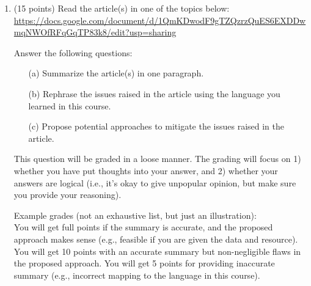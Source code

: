 \documentclass[11pt]{article}
\begin{document}
\begin{enumerate}

\item (15 points) Read the article(s) in one of the topics below:\\
\url{https://docs.google.com/document/d/1QmKDwodF9gTZQzrzQuES6EXDDwmqNWOfRFqGqTP83k8/edit?usp=sharing}

Answer the following questions:
\begin{itemize}
    \item[(a)] Summarize the article(s) in one paragraph.
    \item[(b)] Rephrase the issues raised in the article using the language you learned in this course.
    \item[(c)] Propose potential approaches to mitigate the issues raised in the article.
\end{itemize}

This question will be graded in a loose manner.
The grading will focus on 
1) whether you have put thoughts into your answer, and
2) whether your answers are logical (i.e., it's okay to give unpopular opinion, but make sure you provide your reasoning).

Example grades (not an exhaustive list, but just an illustration):\\
You will get full points if the summary is accurate, and the proposed approach makes sense (e.g., feasible if you are given the data and resource). 
You will get 10 points with an accurate summary but non-negligible flaws in the proposed approach.  
You will get 5 points for providing inaccurate summary (e.g., incorrect mapping to the language in this course).

\end{enumerate}

\end{document}
